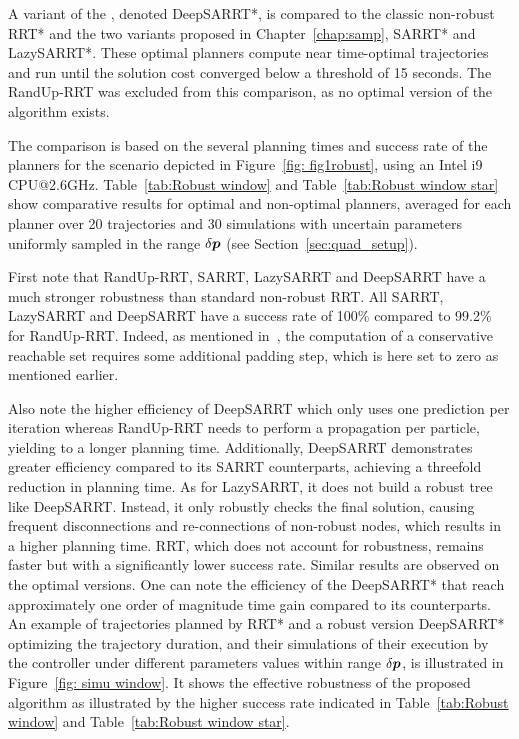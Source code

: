 


A  variant of the , denoted DeepSARRT*, is compared to the classic non-robust RRT* and the two variants proposed in Chapter~\ref{chap:samp}, SARRT* and LazySARRT*. 
These optimal planners compute near time-optimal trajectories and run until the solution cost converged below a threshold of 15 seconds. 
The RandUp-RRT was excluded from this comparison, as no optimal version of the algorithm exists.

The comparison is based on the several planning times and success rate of the planners for the scenario depicted in Figure~\ref{fig: fig1robust}, using an Intel i9 CPU@2.6GHz.
Table~\ref{tab:Robust window} and Table~\ref{tab:Robust window star} show comparative results for optimal and non-optimal planners, averaged for each planner over 20 trajectories and 30 simulations with uncertain parameters uniformly sampled in the range $\delta\boldsymbol{p}$ (see Section~\ref{sec:quad_setup}). 

First note that RandUp-RRT, SARRT, LazySARRT and DeepSARRT have a much stronger robustness than standard non-robust RRT. 
All SARRT, LazySARRT and DeepSARRT have a success rate of 100\% compared to 99.2\% for RandUp-RRT. 
Indeed, as mentioned in~\cite{cRandUpRRT, cRandUP}, the computation of a conservative reachable set requires some additional padding step, which is here set to zero as mentioned earlier.

Also note the higher efficiency of DeepSARRT which only uses one prediction per iteration whereas RandUp-RRT needs to perform a propagation per particle, yielding to a longer planning time. 
Additionally, DeepSARRT demonstrates greater efficiency compared to its SARRT counterparts, achieving a threefold reduction in planning time.
As for LazySARRT, it does not build a robust tree like DeepSARRT. 
Instead, it only robustly checks the final solution, causing frequent disconnections and re-connections of non-robust nodes, which results in a higher planning time.
RRT, which does not account for robustness, remains faster but with a significantly lower success rate. 
Similar results are observed on the optimal versions. 
One can note the efficiency of the DeepSARRT* that reach approximately one order of magnitude time gain compared to its  counterparts. 
An example of trajectories planned by RRT* and a robust version DeepSARRT* optimizing the trajectory duration, and their simulations of their execution by the controller under different parameters values within range $\delta\boldsymbol{p}$, is illustrated in Figure~\ref{fig: simu window}.
It shows the effective robustness of the proposed algorithm as illustrated by the higher success rate indicated in Table~\ref{tab:Robust window} and Table~\ref{tab:Robust window star}.

